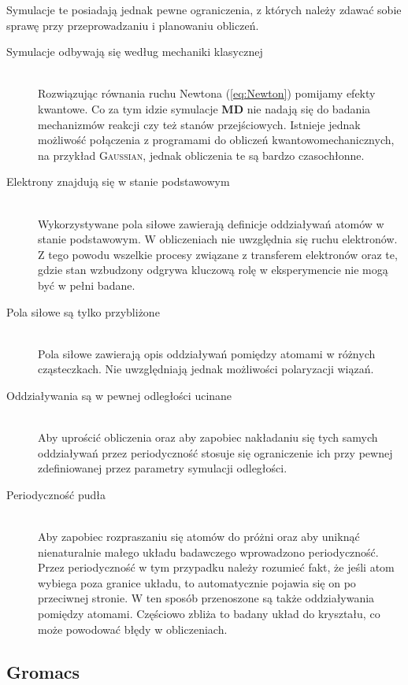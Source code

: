 Symulacje te posiadają jednak pewne ograniczenia, z których należy zdawać sobie sprawę przy przeprowadzaniu i planowaniu obliczeń.
\begin{description}
\item[Symulacje odbywają się według mechaniki klasycznej] \hfill \\
Rozwiązując równania ruchu Newtona (\ref{eq:Newton}) pomijamy efekty kwantowe. Co za tym idzie symulacje \textbf{MD} nie nadają się do badania mechanizmów reakcji czy też stanów przejściowych. Istnieje jednak możliwość połączenia z programami do obliczeń kwantowomechanicznych, na przykład \textsc{Gaussian}, jednak obliczenia te są bardzo czasochłonne.
\item[Elektrony znajdują się w stanie podstawowym] \hfill \\
Wykorzystywane pola siłowe zawierają definicje oddziaływań atomów w stanie podstawowym. W obliczeniach nie uwzględnia się ruchu elektronów. Z tego powodu wszelkie procesy związane z transferem elektronów oraz te, gdzie stan wzbudzony odgrywa kluczową rolę w eksperymencie nie mogą być w pełni badane.
\item[Pola siłowe są tylko przybliżone] \hfill \\
Pola siłowe zawierają opis oddziaływań pomiędzy atomami w różnych cząsteczkach. Nie uwzględniają jednak możliwości polaryzacji wiązań. 
\item[Oddziaływania są w pewnej odległości ucinane] \hfill \\
Aby uprościć obliczenia oraz aby zapobiec nakładaniu się tych samych oddziaływań przez periodyczność stosuje się ograniczenie ich przy pewnej zdefiniowanej przez parametry symulacji odległości.
\item[Periodyczność pudła] \hfill \\
Aby zapobiec rozpraszaniu się atomów do próżni oraz aby uniknąć nienaturalnie małego układu badawczego wprowadzono periodyczność. Przez periodyczność w tym przypadku należy rozumieć fakt, że jeśli atom wybiega poza granice układu, to automatycznie pojawia się on po przeciwnej stronie. W ten sposób przenoszone są także oddziaływania pomiędzy atomami. Częściowo zbliża to badany układ do kryształu, co może powodować błędy w obliczeniach.
\end{description}
 

\subsection{Gromacs}\

